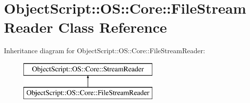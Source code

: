 \hypertarget{class_object_script_1_1_o_s_1_1_core_1_1_file_stream_reader}{}\section{Object\+Script\+:\+:OS\+:\+:Core\+:\+:File\+Stream\+Reader Class Reference}
\label{class_object_script_1_1_o_s_1_1_core_1_1_file_stream_reader}
Inheritance diagram for Object\+Script\+:\+:OS\+:\+:Core\+:\+:File\+Stream\+Reader\+:\begin{figure}[H]
\begin{center}
\leavevmode
\includegraphics[height=2.000000cm]{class_object_script_1_1_o_s_1_1_core_1_1_file_stream_reader}
\end{center}
\end{figure}
